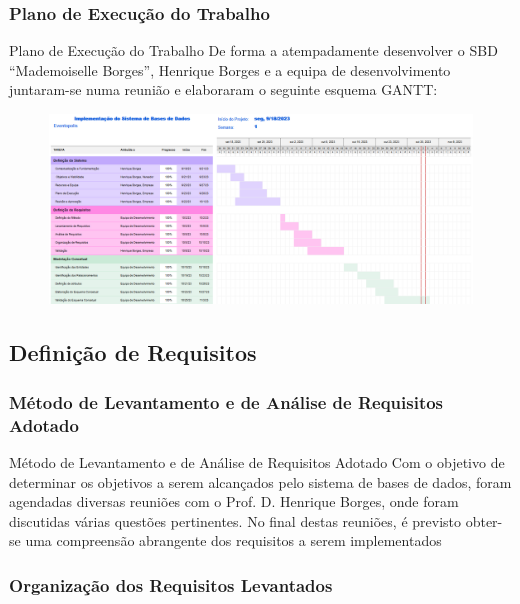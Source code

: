 \documentclass[compress,svgnames,handout,13.7pt]{beamer}
\begin{document}
\subsubsection{Plano de Execução do Trabalho}
\begin{frame}{Plano de Execução do Trabalho}
De forma a atempadamente desenvolver o SBD ``Mademoiselle Borges'', Henrique Borges e a equipa de desenvolvimento juntaram-se numa reuni\~ao e elaboraram o seguinte esquema GANTT:
\begin{figure}[h]
            \centering
            \includegraphics[width=4.75in]{images/GANTT1_c1.png}
        \end{figure}
\end{frame}

\subsection{Definição de Requisitos}

\subsubsection{Método de Levantamento e de Análise de Requisitos Adotado}
\begin{frame}{Método de Levantamento e de Análise de Requisitos Adotado}
Com o objetivo de determinar os objetivos a serem alcançados pelo sistema de bases de dados, foram agendadas diversas reuniões com o Prof. D. Henrique Borges, onde foram discutidas várias questões pertinentes. No final destas reuniões, é previsto obter-se uma compreensão abrangente dos requisitos a serem implementados
\end{frame}

\subsubsection{Organização dos Requisitos Levantados}
\end{document}
